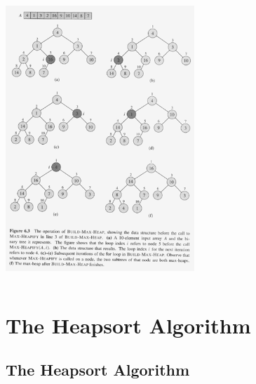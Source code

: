 \documentclass[notes,serif]{beamer}
\begin{document}
\begin{frame}
\begin{columns}
  \begin{block}{}
    \includegraphics[height=10cm]{06-fig-build_max_heap}
  \end{block}
\end{columns}
\end{frame}

\section{The Heapsort Algorithm}
\subsection{The Heapsort Algorithm}
\end{document}
